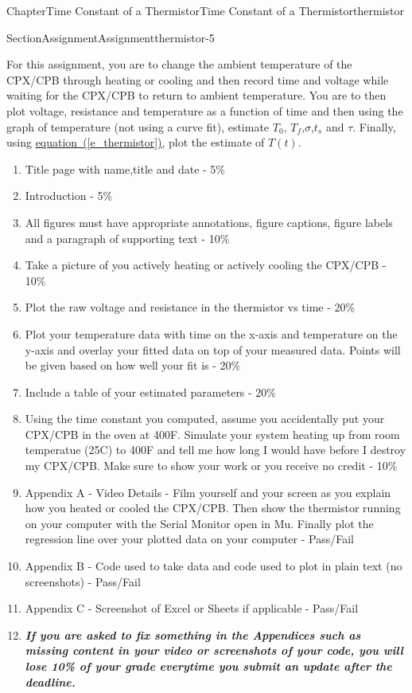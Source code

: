 \documentclass[oneside,10pt,]{book}
\newcommand{\xreffont}{\relax}
\newcommand{\linkhilite}[1]{\underline{#1}}
\newcommand{\alert}[1]{\textbf{\textit{#1}}}
\numberwithin{equation}{section}
\begin{document}
\begin{chapterptx}{Chapter}{Time Constant of a Thermistor}{}{Time Constant of a Thermistor}{}{}{thermistor}
\typeout{************************************************}
%
\begin{sectionptx}{Section}{Assignment}{}{Assignment}{}{}{thermistor-5}
\begin{introduction}{}%
For this assignment, you are to change the ambient temperature of the CPX\slash{}CPB through heating or cooling and then record time and voltage while waiting for the CPX\slash{}CPB to return to ambient temperature. You are to then plot voltage, resistance and temperature as a function of time and then using the graph of temperature (not using a curve fit), estimate \(T_0\), \(T_f\),\(\sigma\),\(t_s\) and \(\tau\). Finally, using \hyperref[e_thermistor]{\linkhilite{equation~({\xreffont\ref{e_thermistor}})}}, plot the estimate of \(T(t)\).%
%
\begin{enumerate}
\item{}Title page with name,title and date - 5\%%
\item{}Introduction - 5\%%
\item{}All figures must have appropriate annotations, figure captions, figure labels and a paragraph of supporting text - 10\%%
\item{}Take a picture of you actively heating or actively cooling the CPX\slash{}CPB - 10\%%
\item{}Plot the raw voltage and resistance in the thermistor vs time - 20\%%
\item{}Plot your temperature data with time on the x-axis and temperature on the y-axis and overlay your fitted data on top of your measured data. Points will be given based on how well your fit is - 20\%%
\item{}Include a table of your estimated parameters - 20\%%
\item{}Using the time constant you computed, assume you accidentally put your CPX\slash{}CPB in the oven at 400F. Simulate your system heating up from room temperatue (25C) to 400F and tell me how long I would have before I destroy my CPX\slash{}CPB. Make sure to show your work or you receive no credit - 10\%%
\item{}Appendix A - Video Details - Film yourself and your screen as you explain how you heated or cooled the CPX\slash{}CPB. Then show the thermistor running on your computer with the Serial Monitor open in Mu. Finally plot the regression line over your plotted data on your computer - Pass\slash{}Fail%
\item{}Appendix B - Code used to take data and code used to plot in plain text (no screenshots) - Pass\slash{}Fail%
\item{}Appendix C - Screenshot of Excel or Sheets if applicable - Pass\slash{}Fail%
\item{}\alert{If you are asked to fix something in the Appendices such as missing content in your video or screenshots of your code, you will lose 10\% of your grade everytime you submit an update after the deadline.}%
\end{enumerate}
\end{introduction}%
\end{sectionptx}
\end{chapterptx}
\end{document}
